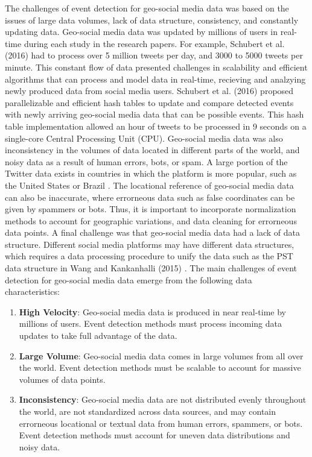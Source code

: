 The challenges of event detection for geo-social media data was based on the issues of large data volumes, lack of data structure, consistency, and constantly updating data. Geo-social media data was updated by millions of users in real-time during each study in the research papers. For example, Schubert et al. (2016) \cite{Schubert:2016} had to process over 5 million tweets per day, and 3000 to 5000 tweets per minute. This constant flow of data presented challenges in scalability and efficient algorithms that can process and model data in real-time, recieving and analzying newly produced data from social media users. Schubert et al. (2016) \cite{Schubert:2016} proposed parallelizable and efficient hash tables to update and compare detected events with newly arriving geo-social media data that can be possible events. This hash table implementation allowed an hour of tweets to be processed in 9 seconds on a single-core Central Processing Unit (CPU). Geo-social media data was also inconsistency in the volumes of data located in different parts of the world, and noisy data as a result of human errors, bots, or spam. A large portion of the Twitter data exists in countries in which the platform is more popular, such as the United States or Brazil \cite{Schubert:2016}. The locational reference of geo-social media data can also be inaccurate, where errorneous data such as false coordinates can be given by spammers or bots. Thus, it is important to incorporate normalization methods to account for geographic variations, and data cleaning for errorneous data points. A final challenge was that geo-social media data had a lack of data structure. Different social media platforms may have different data structures, which requires a data processing procedure to unify the data such as the PST data structure in Wang and Kankanhalli (2015) \cite{Wang:2015}. The main challenges of event detection for geo-social media data emerge from the following data characteristics:

\begin{enumerate}[label=(\alph*)]
  \item \textbf{High Velocity}: Geo-social media data is produced in near real-time by millions of users. Event detection methods must process incoming data updates to take full advantage of the data.
  \item \textbf{Large Volume}: Geo-social media data comes in large volumes from all over the world. Event detection methods must be scalable to account for massive volumes of data points.
  \item \textbf{Inconsistency}:  Geo-social media data are not distributed evenly throughout the world, are not standardized across data sources, and may contain errorneous locational or textual data from human errors, spammers, or bots. Event detection methods must account for uneven data distributions and noisy data.
\end{enumerate}


